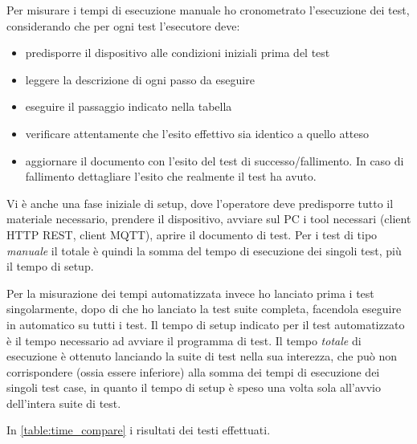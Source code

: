 \documentclass[12pt,a4paper,twoside,titlepage]{book}
\begin{document}
Per misurare i tempi di esecuzione manuale ho cronometrato l'esecuzione dei test, considerando che 
per ogni test l'esecutore deve:
\begin{itemize}
    \item predisporre il dispositivo alle condizioni iniziali prima del test
    \item leggere la descrizione di ogni passo da eseguire
    \item eseguire il passaggio indicato nella tabella 
    \item verificare attentamente che l'esito effettivo sia identico a quello atteso 
    \item aggiornare il documento con l'esito del test di successo/fallimento. In caso di fallimento dettagliare 
        l'esito che realmente il test ha avuto. 
\end{itemize}

Vi è anche una fase iniziale di setup, dove l'operatore deve predisporre tutto il materiale necessario, 
prendere il dispositivo, avviare sul PC i tool necessari (client HTTP REST, client MQTT), aprire il documento 
di test. Per i test di tipo \textit{manuale} il totale è quindi la somma del tempo di esecuzione dei singoli 
test, più il tempo di setup. 

Per la misurazione dei tempi automatizzata invece ho lanciato prima i test singolarmente, dopo di che ho lanciato 
la test suite completa, facendola eseguire in automatico su tutti i test. Il tempo di setup indicato per il test 
automatizzato è il tempo necessario ad avviare il programma di test. Il tempo \textit{totale} di esecuzione è ottenuto
lanciando la suite di test nella sua interezza, che può non corrispondere (ossia essere inferiore) alla somma dei 
tempi di esecuzione dei singoli test case, in quanto il tempo di setup è speso una volta sola all'avvio dell'intera 
suite di test.  

In \autoref{table:time_compare} i risultati dei testi effettuati.
\end{document}
